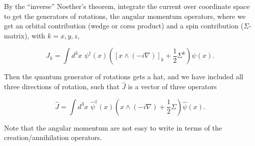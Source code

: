 \noindent By the ``inverse'' Noether's theorem, integrate the current over coordinate space to get the generators of rotations, the angular momentum operators, where we get an orbital contribution (wedge or corss product) and a spin contribution ($\Sigma$-matrix), with $k = x, y, z$,

\begin{equation}
J_k = \int d^3 x \,\, \psi^\dagger (x) \left( \left[ x \wedge (-i \nabla) \right]_k + \frac{1}{2} \Sigma^k \right) \psi (x) .
\end{equation}

\noindent Then the quantum generator of rotations gets a hat, and we have included all three directions of rotation, such that $\hat{J}$ is a vector of three operators

\begin{equation}
\hat{J} = \int d^3 x \,\, \hat{\psi}^\dagger (x) \left( x \wedge (-i \nabla) + \frac{1}{2} \Sigma \right) \hat{\psi} (x) .
\end{equation}

\noindent Note that the angular momentum are not easy to write in terms of the creation/annihilation operators.